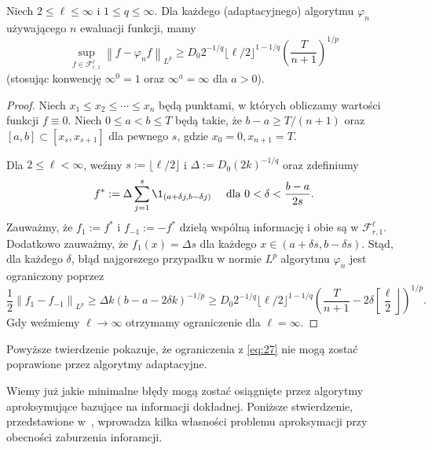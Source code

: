 \documentclass[oik, pdftex, robocza, man]{mgrwms}
\begin{document}
    \begin{stw}
        Niech $2 \leq \ell \leq \infty$ i $1 \leq q \leq \infty$. Dla każdego (adaptacyjnego) algorytmu $\varphi_{n}$ używającego $n$ ewaluacji funkcji, mamy
        \begin{equation*}
            \sup _{f \in \mathcal{F}_{r, 1}^{\ell}}\left\|f-\varphi_{n} f\right\|_{L^{p}} \geq D_{0} 2^{-1 / q}\lfloor\ell / 2\rfloor^{1-1 / q}\left(\frac{T}{n+1}\right)^{1 / p}    
        \end{equation*}
        (stosując konwencję $\infty^{0}=1$ oraz $\infty^{a}=\infty$ dla $a>0$).
    \end{stw}
    \begin{proof}
        Niech $x_{1} \leq x_{2} \leq \cdots \leq x_{n}$ będą punktami, w których obliczamy wartości funkcji $f \equiv 0$. Niech $0 \leq a<b \leq T$ będą takie, że $b-a \geq T /(n+1)$ oraz $[a, b] \subset\left[x_{s}, x_{s+1}\right]$ dla pewnego $s$, gdzie $x_{0}=0, x_{n+1}=T$.

        Dla $2 \leq \ell<\infty$, weźmy $s:=\lfloor\ell / 2\rfloor$ i $\Delta:=D_{0}(2 k)^{-1 / q}$ oraz zdefiniumy
        \begin{equation*}
            f^{*}:=\Delta \sum_{j=1}^{s} \1_{(a+\delta j, b-\delta j)} \quad \text{ dla } 0<\delta<\frac{b-a}{2 s}.
        \end{equation*}
        Zauważmy, że $f_{1}:=f^{*}$ i $f_{-1}:=-f^{*}$ dzielą wspólną informację i obie są w $\mathcal{F}_{r, 1}^{\ell}$. Dodatkowo zauważmy, że  $f_{1}(x)=\Delta s$ dla każdego $x \in(a+\delta s, b-\delta s)$. Stąd, dla każdego $\delta$, błąd najgorszego przypadku w normie $L^{p}$ algorytmu $\varphi_{n}$ jest ograniczony poprzez
        \begin{equation*}
            \frac{1}{2}\left\|f_{1}-f_{-1}\right\|_{L^{p}} \geq \Delta k(b-a-2 \delta k)^{-1 / p} \geq D_{0} 2^{-1 / q}\lfloor\ell / 2\rfloor^{1-1 / q}\left(\frac{T}{n+1}-2 \delta\left[\frac{\ell}{2}\right\rfloor\right)^{1 / p}.
        \end{equation*}
        Gdy weźmiemy $\ell \rightarrow \infty$ otrzymamy ograniczenie dla $\ell = \infty$.
    \end{proof}

    Powyższe twierdzenie pokazuje, że ograniczenia z \eqref{eq:27} nie mogą zostać poprawione przez algorytmy adaptacyjne.

    Wiemy już jakie minimalne błędy mogą zostać osiągnięte przez algorytmy aproksymujące bazujące na informacji dokładnej. Poniższe stwierdzenie, przedstawione w~\cite{AoP}, wprowadza kilka własności problemu aproksymacji przy obecności zaburzenia inforamcji.
\end{document}

